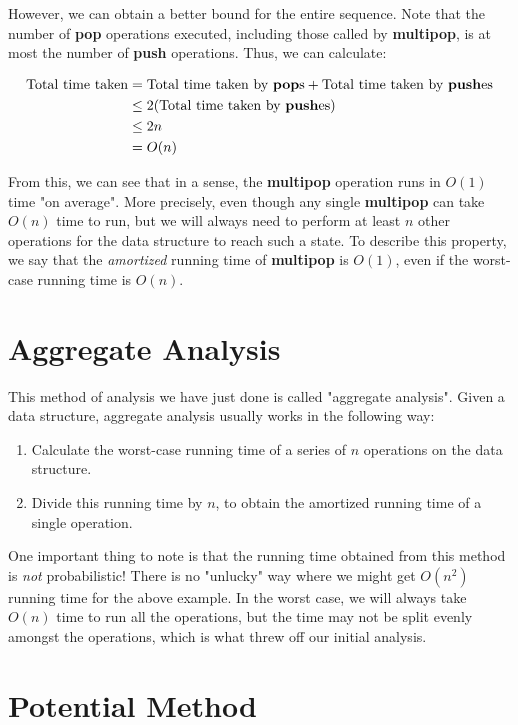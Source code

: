 However, we can obtain a better bound for the entire sequence. Note that the number of \textbf{pop} operations executed, including those called by \textbf{multipop}, is at most the number of \textbf{push} operations. Thus, we can calculate:

\begin{align*}
  \mbox{Total time taken} 
  &= \mbox{Total time taken by \textbf{pop}s} + \mbox{Total time taken by \textbf{push}es} \\
  &\leq 2(\mbox{Total time taken by \textbf{push}es}) \\
  &\leq 2n \\
  &= O(n)
\end{align*}

From this, we can see that in a sense, the \textbf{multipop} operation runs in $O(1)$ time "on average". More precisely, even though any single \textbf{multipop} can take $O(n)$ time to run, but we will always need to perform at least $n$ other operations for the data structure to reach such a state. To describe this property, we say that the \textit{amortized} running time of \textbf{multipop} is $O(1)$, even if the worst-case running time is $O(n)$.

\section*{Aggregate Analysis}

This method of analysis we have just done is called "aggregate analysis". Given a data structure, aggregate analysis usually works in the following way:
\begin{enumerate}
  \item Calculate the worst-case running time of a series of $n$ operations on the data structure.
  \item Divide this running time by $n$, to obtain the amortized running time of a single operation.
\end{enumerate}

One important thing to note is that the running time obtained from this method is \textit{not} probabilistic! There is no "unlucky" way where we might get $O(n^2)$ running time for the above example. In the worst case, we will always take $O(n)$ time to run all the operations, but the time may not be split evenly amongst the operations, which is what threw off our initial analysis.

\section*{Potential Method}

